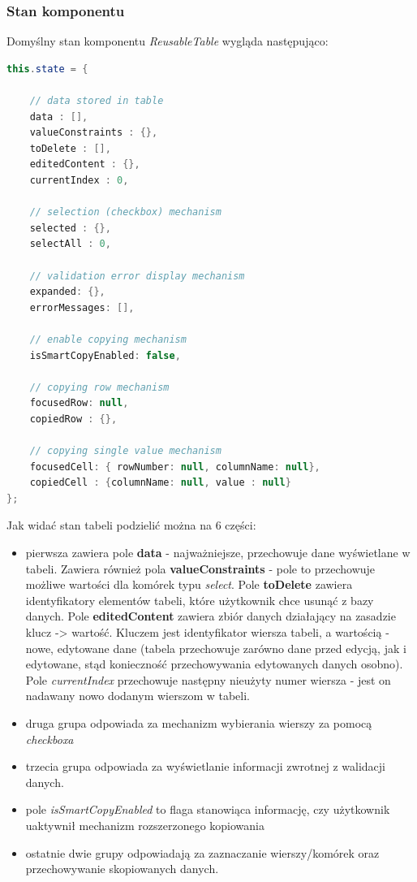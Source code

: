 \documentclass[11pt]{article}
\begin{document}
\subsubsection{Stan komponentu}
Domyślny stan komponentu \emph{ReusableTable} wygląda następująco:
\begin{lstlisting}[language=java]
this.state = {

	// data stored in table
	data : [],
	valueConstraints : {},
	toDelete : [],
	editedContent : {},
	currentIndex : 0,

	// selection (checkbox) mechanism
	selected : {},
	selectAll : 0,

	// validation error display mechanism
	expanded: {},
	errorMessages: [],

	// enable copying mechanism
	isSmartCopyEnabled: false,

	// copying row mechanism
	focusedRow: null,
	copiedRow : {},

	// copying single value mechanism
	focusedCell: { rowNumber: null, columnName: null},
	copiedCell : {columnName: null, value : null}
};
\end{lstlisting}
Jak widać stan tabeli podzielić można na 6 części:
\begin{itemize}
\item pierwsza zawiera pole \textbf{data} - najważniejsze, przechowuje dane wyświetlane w tabeli. Zawiera również pola \textbf{valueConstraints} - pole to przechowuje możliwe wartości dla komórek typu \emph{select}. Pole \textbf{toDelete} zawiera identyfikatory elementów tabeli, które użytkownik chce usunąć z bazy danych. Pole \textbf{editedContent} zawiera zbiór danych działający na zasadzie klucz -> wartość. Kluczem jest identyfikator wiersza tabeli, a wartością - nowe, edytowane dane (tabela przechowuje zarówno dane przed edycją, jak i edytowane, stąd konieczność przechowywania edytowanych danych osobno). Pole \emph{currentIndex} przechowuje następny nieużyty numer wiersza - jest on nadawany nowo dodanym wierszom w tabeli. 
\item druga grupa odpowiada za mechanizm wybierania wierszy za pomocą \emph{checkboxa}
\item trzecia grupa odpowiada za wyświetlanie informacji zwrotnej z walidacji danych. 
\item pole \emph{isSmartCopyEnabled} to flaga stanowiąca informację, czy użytkownik uaktywnił mechanizm rozszerzonego kopiowania
\item ostatnie dwie grupy odpowiadają za zaznaczanie wierszy/komórek oraz przechowywanie skopiowanych danych.
\end{itemize}
\end{document}
